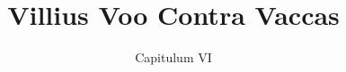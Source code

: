\documentclass[20pt, titlepage, twoside]{extarticle}
\begin{document}
\title{Villius Voo Contra Vaccas}
\author{Capitulum VI}
\date{}
\maketitle
\begin{large}
\end{large}
\pagebreak
\begin{multicols}{2}
\begin{footnotesize}
    \noindent %
\end{footnotesize}
\end{multicols}
\end{document}
